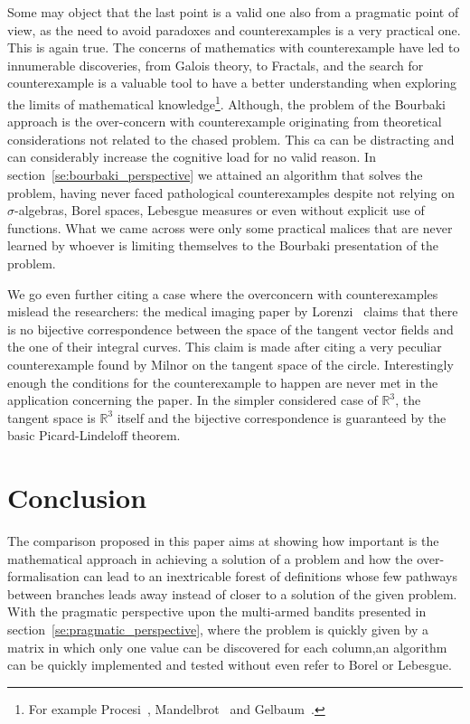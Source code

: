 \documentclass[]{scrartcl}
\begin{document}
Some may object that the last point is a valid one also from a pragmatic point of view, as the need to avoid paradoxes and counterexamples is a very practical one. This is again true. The concerns of mathematics with counterexample have led to innumerable discoveries, from Galois theory, to Fractals, and the search for counterexample is a valuable tool to have a better understanding when exploring the limits of mathematical knowledge\footnote{
    For example Procesi~\cite{procesi1977elementi}, Mandelbrot~\cite{mandelbrot1983fractal} and Gelbaum~\cite{gelbaum2003counterexamples}.
}. Although, the problem of the Bourbaki approach is the over-concern with counterexample originating from theoretical considerations not related to the chased problem. This ca can be distracting and can considerably increase the cognitive load for no valid reason. In section~\ref{se:bourbaki_perspective} we attained an algorithm that solves the problem, having never faced pathological counterexamples despite not relying on $\sigma$-algebras, Borel spaces, Lebesgue measures or even without explicit use of functions. What we came across were only some practical malices that are never learned by whoever is limiting themselves to the Bourbaki presentation of the problem.

We go even further citing a case where the overconcern with counterexamples mislead the researchers:
the medical imaging paper by Lorenzi~\cite{lorenzi2013geodesics} claims that there is no bijective correspondence between the space of the tangent vector fields and the one of their integral curves. This claim is made after citing a very peculiar counterexample found by Milnor on the tangent space of the circle.
Interestingly enough the conditions for the counterexample to happen are never met in the application concerning the paper. In the simpler considered case of $\mathbb{R}^3$, the tangent space is $\mathbb{R}^3$ itself and the bijective correspondence is guaranteed by the basic Picard-Lindeloff theorem.




\section{Conclusion}

The comparison proposed in this paper aims at showing how important is the mathematical approach in achieving a solution of a problem and how the over-formalisation can lead to an inextricable forest of definitions whose few pathways between branches leads away instead of closer to a solution of the given problem.  
With the pragmatic perspective upon the multi-armed bandits presented in section~\ref{se:pragmatic_perspective}, where the problem is quickly given by a matrix in which only one value can be discovered for each column,an algorithm can be quickly implemented and tested without even refer to Borel or Lebesgue.
\end{document}
